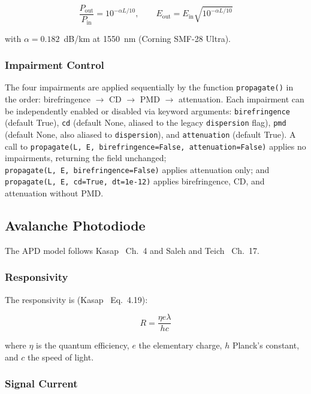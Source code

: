 \documentclass[3p,times,preprint]{elsarticle}
\begin{document}
\begin{equation}
  \frac{P_{\text{out}}}{P_{\text{in}}} = 10^{-\alpha L/10},
  \qquad
  E_{\text{out}} = E_{\text{in}} \sqrt{10^{-\alpha L/10}}
  \label{eq:att}
\end{equation}

with $\alpha = 0.182$~dB/km at 1550~nm (Corning SMF-28 Ultra).

\subsubsection{Impairment Control}

The four impairments are applied sequentially by the function
\texttt{propagate()} in the order: birefringence $\to$ CD $\to$
PMD $\to$ attenuation.  Each impairment can be independently
enabled or disabled via keyword arguments:
\texttt{birefringence} (default True), \texttt{cd} (default None,
aliased to the legacy \texttt{dispersion} flag), \texttt{pmd}
(default None, also aliased to \texttt{dispersion}), and
\texttt{attenuation} (default True).  A call to
\texttt{propagate(L,\ E,\ birefringence=False,\ attenuation=False)}
applies no impairments, returning the field unchanged;
\texttt{propagate(L,\ E,\ birefringence=False)} applies attenuation
only; and \texttt{propagate(L,\ E,\ cd=True,\ dt=1e-12)} applies
birefringence, CD, and attenuation without PMD.

\subsection{Avalanche Photodiode}

The APD model follows Kasap~\cite{kasap} Ch.~4 and
Saleh and Teich~\cite{saleh} Ch.~17.

\subsubsection{Responsivity}

The responsivity is (Kasap~\cite{kasap} Eq.~4.19):

\begin{equation}
  R = \frac{\eta e \lambda}{h c}
  \label{eq:responsivity}
\end{equation}

where $\eta$ is the quantum efficiency, $e$ the elementary charge,
$h$ Planck's constant, and $c$ the speed of light.

\subsubsection{Signal Current}
\end{document}
